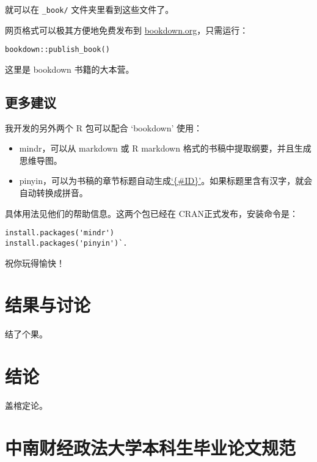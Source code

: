 \documentclass[doublesided]{Style/ucasthesis}%
\begin{document}
就可以在 \texttt{\_book/} 文件夹里看到这些文件了。

网页格式可以极其方便地免费发布到 \href{https://bookdown.org}{bookdown.org}，只需运行：

\begin{verbatim}
bookdown::publish_book()
\end{verbatim}

这里是 bookdown 书籍的大本营。

\hypertarget{section-8}{%
\section{更多建议}\label{section-8}}

我开发的另外两个 R 包可以配合 `bookdown' 使用：

\begin{itemize}
\item
  mindr，可以从 markdown 或 R markdown 格式的书稿中提取纲要，并且生成思维导图。
\item
  pinyin，可以为书稿的章节标题自动生成\href{https://bookdown.org/yihui/bookdown/cross-references.html}{`\{\#ID\}'}。如果标题里含有汉字，就会自动转换成拼音。
\end{itemize}

具体用法见他们的帮助信息。这两个包已经在 CRAN正式发布，安装命令是：

\begin{verbatim}
install.packages('mindr')
install.packages('pinyin')`.
\end{verbatim}

祝你玩得愉快！

\hypertarget{results}{%
\chapter{结果与讨论}\label{results}}

结了个果。

\hypertarget{conclusion}{%
\chapter{结论}\label{conclusion}}

盖棺定论。

\appendix

\hypertarget{section-9}{%
\chapter{中南财经政法大学本科生毕业论文规范}\label{section-9}}
\end{document}

